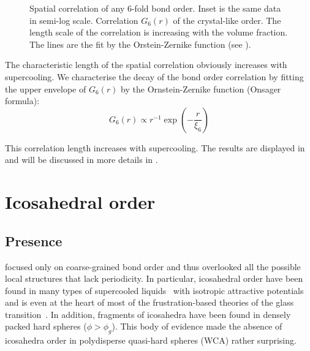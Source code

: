 \begin{figure}
	\centering
	\caption{ Spatial correlation of any 6-fold bond order. Inset is the same data in semi-log scale.  Correlation $G_6(r)$ of the crystal-like order. The length scale of the correlation is increasing with the volume fraction. The lines are the fit by the Orstein-Zernike function (see ).}
	\label{fig:G6}
\end{figure}

The characteristic length of the spatial correlation obviously increases with supercooling. We characterise the decay of the bond order correlation by fitting the upper envelope of $G_6(r)$ by the Ornstein-Zernike function (Onsager formula):
\begin{equation}
	G_6(r) \propto r^{-1}\exp( -\frac{r}{\xi_6} )
	\label{eq:OZ}
\end{equation}

This correlation length increases with supercooling. The results are displayed in  and will be discussed in more details in .

\section{Icosahedral order}

\subsection{Presence}

\citet{Kawasaki2010} focused only on coarse-grained bond order and thus overlooked all the possible local structures that lack periodicity. In particular, icosahedral order have been found in many types of supercooled liquids~\citep{steinhardt1983boo, Jonsson1988, Tomida1995, DiCicco2003, Coslovich2007} with isotropic attractive potentials and is even at the heart of most of the frustration-based theories of the glass transition~\citep{tarjus2005fba, Celino2007, VanMeel2009}. In addition, fragments of icosahedra have been found in densely packed hard spheres ($\phi>\phi_g$). This body of evidence made the absence of icosahedra order in polydisperse quasi-hard spheres (\acs{WCA}) rather surprising.

